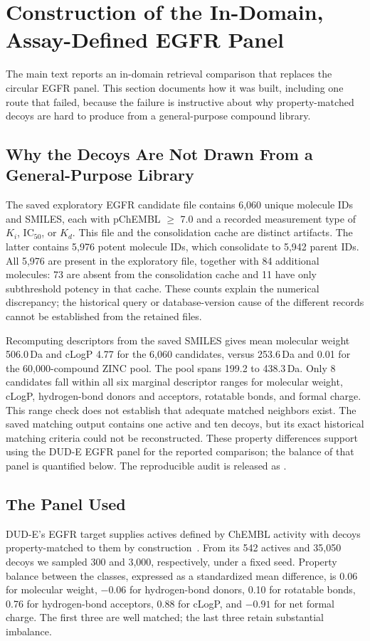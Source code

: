 \documentclass[11pt]{article}
\begin{document}
\section{Construction of the In-Domain, Assay-Defined EGFR Panel}
The main text reports an in-domain retrieval comparison that replaces the circular EGFR panel. This section documents how it was built, including one route that failed, because the failure is instructive about why property-matched decoys are hard to produce from a general-purpose compound library.

\subsection{Why the Decoys Are Not Drawn From a General-Purpose Library}
The saved exploratory EGFR candidate file contains 6,060 unique molecule IDs
and SMILES, each with pChEMBL $\geq$ 7.0 and a recorded measurement type of
$K_i$, IC$_{50}$, or $K_d$. This file and the consolidation cache are distinct
artifacts. The latter contains 5,976 potent molecule IDs, which consolidate to
5,942 parent IDs. All 5,976 are present in the exploratory file, together with
84 additional molecules: 73 are absent from the consolidation cache and 11
have only subthreshold potency in that cache. These counts explain the
numerical discrepancy; the historical query or database-version cause of the
different records cannot be established from the retained files.

Recomputing descriptors from the saved SMILES gives mean molecular weight
506.0\,Da and cLogP 4.77 for the 6,060 candidates, versus 253.6\,Da and 0.01 for
the 60,000-compound ZINC pool. The pool spans 199.2 to 438.3\,Da. Only 8
candidates fall within all six marginal descriptor ranges for molecular weight, cLogP,
hydrogen-bond donors and acceptors, rotatable bonds, and formal charge. This
range check does not establish that adequate matched neighbors exist. The
saved matching output contains one active and ten decoys, but its exact
historical matching criteria could not be reconstructed. These property
differences support using the DUD-E EGFR panel for the reported comparison;
the balance of that panel is quantified below. The reproducible audit is
released as .

\subsection{The Panel Used}
DUD-E's EGFR target supplies actives defined by ChEMBL activity with decoys property-matched to them by construction~\cite{mysinger2012dude}. From its 542 actives and 35,050 decoys we sampled 300 and 3,000, respectively, under a fixed seed. Property balance between the classes, expressed as a standardized mean difference, is 0.06 for molecular weight, $-0.06$ for hydrogen-bond donors, 0.10 for rotatable bonds, 0.76 for hydrogen-bond acceptors, 0.88 for cLogP, and $-0.91$ for net formal charge. The first three are well matched; the last three retain substantial imbalance.
\end{document}
